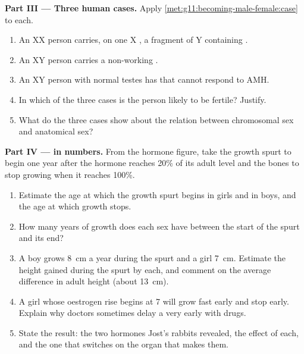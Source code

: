 \begin{problem}
\medskip
\noindent\textbf{Part III --- Three human cases.}
Apply \cref{met:g11:becoming-male-female:case} to each.
\begin{enumerate}[resume]
  \item An XX person carries, on one X , a fragment of Y
        containing .
  \item An XY person carries a non-working .
  \item An XY person with normal testes has  that cannot respond
        to AMH.
  \item In which of the three cases is the person likely to be
        fertile? Justify.
  \item What do the three cases show about the relation between
        chromosomal sex and anatomical sex?
\end{enumerate}

\medskip
\noindent\textbf{Part IV ---  in numbers.}
From the hormone figure, take the growth spurt to begin one year after
the hormone reaches 20\% of its adult level and the bones to stop
growing when it reaches 100\%.
\begin{enumerate}[resume]
  \item Estimate the age at which the growth spurt begins in girls and
        in boys, and the age at which growth stops.
  \item How many years of growth does each sex have between the start
        of the spurt and its end?
  \item A boy grows \qty{8}{cm} a year during the spurt and a girl
        \qty{7}{cm}. Estimate the height gained during the spurt by
        each, and comment on the average difference in adult height
        (about \qty{13}{cm}).
  \item A girl whose oestrogen rise begins at 7 will grow fast early
        and stop early. Explain why doctors sometimes delay a very
        early  with drugs.
  \item State the result: the two hormones Jost's rabbits revealed,
        the effect of each, and the one  that switches on the
        organ that makes them.
\end{enumerate}
\end{problem}
